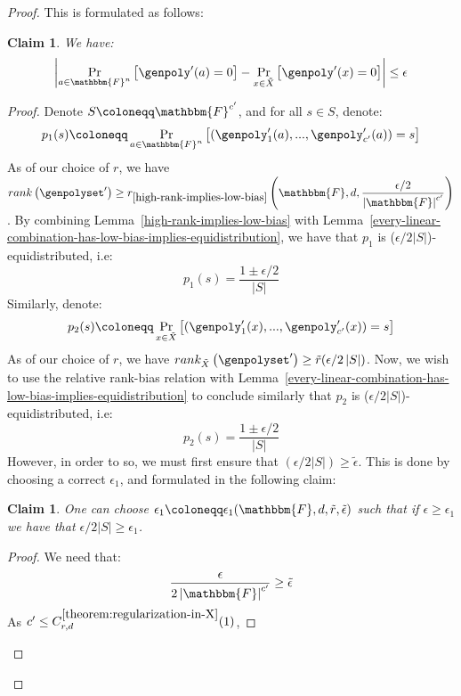 \documentclass[10pt,a4paper]{article}
\newtheorem{claim}[theorem]{Claim}
\newcommand{\definedas}[0]{\coloneqq}
\newcommand{\parens}[1]{\left( #1 \right)}
\newcommand{\basefield}[0]{\mathbbm{F}}
\newcommand{\blocklength}[0]{n}
\newcommand{\field}[0]{\basefield^{\blocklength}}
\newcommand{\degree}[0]{d}
\newcommand{\variety}{{\tilde{X}}}
\newcommand{\rank}[1]{rank \parens{#1}}
\newcommand{\relrank}[2]{rank_{#1} \parens{#2}}
\newcommand{\rankfunc}[0]{{{{r}}}}
\newcommand{\rankbiasfunc}[0]{{\tilde{r}}}
\newcommand{\epsilonlimitedrankbias}[0]{{\tilde{\epsilon}}}
\newcommand{\abs}[1]{\left| #1 \right|}
\newcommand{\prex}[2]{\Pr_{#1}\left[ #2 \right]}
\begin{document}
\begin{proof}
    This is formulated as follows:
    \begin{claim}\label{claim:p-and-P-have-the-same-approximation}
        We have:
        \[
            \abs{\prex{a \in \field}{\genpoly^\prime(a)= 0} -
            \prex{x \in \variety}{\genpoly^\prime(x) = 0}} \leq  \epsilon
        \]
    \end{claim}
    \begin{proof}
        Denote $S \definedas \basefield^{c^\prime}$, and for all $s \in S$, denote:
        \[
            p_1(s) \definedas \prex{a \in \field}{(\genpoly^{\prime}_1(a),...,\genpoly^{\prime}_{c^\prime}(a)) = s}
        \]
        As of our choice of $\rankfunc$, we have $\rank{\genpolyset^{\prime}} \geq \rankfunc_{\ref{high-rank-implies-low-bias}} \parens {\basefield, \degree, \dfrac{\epsilon/2}{\abs{\basefield}^{c^\prime}}}$.
        By combining Lemma~{\ref{high-rank-implies-low-bias}} with Lemma~{\ref{every-linear-combination-has-low-bias-implies-equidistribution}},
        we have that $p_1$ is ($\epsilon/2\abs{S}$)-equidistributed, i.e:
        \[
            p_1(s) = \dfrac{1 \pm \epsilon/2}{\abs{S}}
        \]
        Similarly, denote:
        \[
            p_2(s) \definedas \prex{x \in \variety}{(\genpoly^{\prime}_1(x),...,\genpoly^{\prime}_{c^\prime}(x)) = s}
        \]
        As of our choice of $\rankfunc$, we have $\relrank{\variety}{\genpolyset^\prime} \geq \rankbiasfunc(\epsilon / 2\abs{S})$.
        Now, we wish to use the relative rank-bias relation with Lemma~\ref{every-linear-combination-has-low-bias-implies-equidistribution}
        to conclude similarly that $p_2$ is ($\epsilon/2\abs{S}$)-equidistributed, i.e:
        \[
            p_2(s) = \dfrac{1 \pm \epsilon/2}{\abs{S}}
        \]
        However, in order to so, we must first ensure that $(\epsilon/2\abs{S}) \geq \epsilonlimitedrankbias$.
        This is done by choosing a correct $\epsilon_1$, and formulated in the following claim:
        \begin{claim}
            One can choose $\epsilon_1 \definedas \epsilon_1(\basefield, \degree, \rankbiasfunc, \epsilonlimitedrankbias)$ such that if $\epsilon \geq \epsilon_1$ we have that $\epsilon/2\abs{S} \geq \epsilon_1$.
        \end{claim}
        \begin{proof}
            We need that:
            \[
                \dfrac{\epsilon}{2 \abs{\basefield}^{c^\prime}} \geq \epsilonlimitedrankbias
            \]
            As $c^\prime \leq C^{\ref{theorem:regularization-in-X}}_{\rankfunc, \degree}(1)$,

\end{proof}
\end{proof}
\end{proof}
\end{document}
